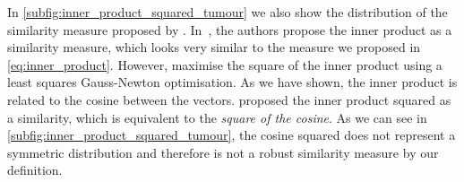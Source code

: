 In \cref{subfig:inner_product_squared_tumour} we also show the
distribution of the similarity measure proposed by \citet{haber2006intensity}.
In~\cite{haber2006intensity}, the authors propose the inner product as a
similarity measure, which looks very similar to the measure we proposed in
\cref{eq:inner_product}. However, \citet{haber2006intensity} maximise the square of the
inner product using a least squares Gauss-Newton optimisation. As we have shown,
the inner product is related to the cosine between the vectors.
\citet{haber2006intensity} proposed the inner product squared as
a similarity, which is equivalent to the \textit{square of the cosine}. As we
can see in \cref{subfig:inner_product_squared_tumour}, the cosine squared
does not represent a symmetric distribution and therefore is not a robust
similarity measure by our definition.
